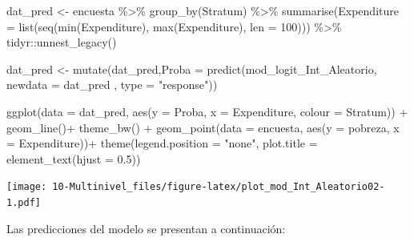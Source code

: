 \documentclass[
  12pt,
]{book}
\newenvironment{Shaded}{\begin{snugshade}}{\end{snugshade}}
\newcommand{\AttributeTok}[1]{\textcolor[rgb]{0.77,0.63,0.00}{#1}}
\newcommand{\DecValTok}[1]{\textcolor[rgb]{0.00,0.00,0.81}{#1}}
\newcommand{\FloatTok}[1]{\textcolor[rgb]{0.00,0.00,0.81}{#1}}
\newcommand{\FunctionTok}[1]{\textcolor[rgb]{0.00,0.00,0.00}{#1}}
\newcommand{\NormalTok}[1]{#1}
\newcommand{\OtherTok}[1]{\textcolor[rgb]{0.56,0.35,0.01}{#1}}
\newcommand{\SpecialCharTok}[1]{\textcolor[rgb]{0.00,0.00,0.00}{#1}}
\newcommand{\StringTok}[1]{\textcolor[rgb]{0.31,0.60,0.02}{#1}}
\begin{document}
\begin{Shaded}
\begin{Highlighting}[]
\NormalTok{dat\_pred }\OtherTok{\textless{}{-}}\NormalTok{ encuesta }\SpecialCharTok{\%\textgreater{}\%} \FunctionTok{group\_by}\NormalTok{(Stratum) }\SpecialCharTok{\%\textgreater{}\%} 
  \FunctionTok{summarise}\NormalTok{(}\AttributeTok{Expenditure =} \FunctionTok{list}\NormalTok{(}\FunctionTok{seq}\NormalTok{(}\FunctionTok{min}\NormalTok{(Expenditure), }
                           \FunctionTok{max}\NormalTok{(Expenditure), }\AttributeTok{len =} \DecValTok{100}\NormalTok{))) }\SpecialCharTok{\%\textgreater{}\%}\NormalTok{ tidyr}\SpecialCharTok{::}\FunctionTok{unnest\_legacy}\NormalTok{()}

\NormalTok{dat\_pred }\OtherTok{\textless{}{-}} \FunctionTok{mutate}\NormalTok{(dat\_pred,}\AttributeTok{Proba =} \FunctionTok{predict}\NormalTok{(mod\_logit\_Int\_Aleatorio, }
                       \AttributeTok{newdata =}\NormalTok{ dat\_pred , }\AttributeTok{type =} \StringTok{"response"}\NormalTok{))}

\FunctionTok{ggplot}\NormalTok{(}\AttributeTok{data =}\NormalTok{ dat\_pred,}
       \FunctionTok{aes}\NormalTok{(}\AttributeTok{y =}\NormalTok{ Proba, }\AttributeTok{x =}\NormalTok{ Expenditure,}
           \AttributeTok{colour =}\NormalTok{ Stratum)) }\SpecialCharTok{+}
   \FunctionTok{geom\_line}\NormalTok{()}\SpecialCharTok{+}   \FunctionTok{theme\_bw}\NormalTok{() }\SpecialCharTok{+}
  \FunctionTok{geom\_point}\NormalTok{(}\AttributeTok{data =}\NormalTok{ encuesta, }\FunctionTok{aes}\NormalTok{(}\AttributeTok{y =}\NormalTok{ pobreza, }\AttributeTok{x =}\NormalTok{ Expenditure))}\SpecialCharTok{+}
  \FunctionTok{theme}\NormalTok{(}\AttributeTok{legend.position =} \StringTok{"none"}\NormalTok{,}
        \AttributeTok{plot.title =} \FunctionTok{element\_text}\NormalTok{(}\AttributeTok{hjust =} \FloatTok{0.5}\NormalTok{))  }
\end{Highlighting}
\end{Shaded}

\texttt{[image: 10-Multinivel\_files/figure-latex/plot\_mod\_Int\_Aleatorio02-1.pdf]}

Las predicciones del modelo se presentan a continuación:

\begin{Shaded}
\end{Shaded}
\end{document}
